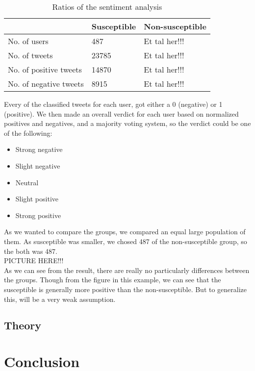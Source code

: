 \documentclass[10pt]{IEEEtran}
\begin{document}
\begin{table}[ht]
\centering
\begin{tabular}{lll}
\hline
                       & Susceptible & Non-susceptible \\ \hline
No. of users           & 487         & Et tal her!!!   \\
No. of tweets          & 23785       & Et tal her!!!   \\
No. of positive tweets & 14870       & Et tal her!!!   \\
No. of negative tweets & 8915        & Et tal her!!!   \\ \hline
\end{tabular}
\caption{Ratios of the sentiment analysis}
\label{tab:sentimentKeyNumbers}
\end{table}

Every of the classified tweets for each user, got either a 0 (negative) or 1 (positive). We then made an overall verdict for each user based on normalized positives and negatives, and a majority voting system, so the verdict could be one of the following:

\begin{itemize}
  \item Strong negative
  \item Slight negative
  \item Neutral
  \item Slight positive
  \item Strong positive\\
\end{itemize}

As we wanted to compare the groups, we compared an equal large population of them. As susceptible was smaller, we chosed 487 of the non-susceptible group, so the both was 487.  \\

PICTURE HERE!!!\\

As we can see from the result, there are really no particularly differences between the groups. Though from the figure in this example, we can see that the susceptible is generally more positive than the non-susceptible. But to generalize this, will be a very weak assumption. 

\subsection{Theory}

\section{Conclusion}
\end{document}
